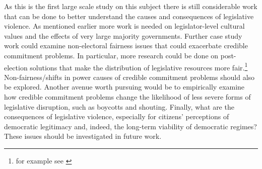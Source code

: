 \documentclass[a4paper]{article}\usepackage[]{graphicx}\usepackage[]{color}
\begin{document}
As this is the first large scale study on this subject there is still considerable work that can be done to better understand the causes and consequences of legislative violence. As mentioned earlier more work is needed on legislator-level cultural values and the effects of very large majority governments. Further case study work could examine non-electoral fairness issues that could exacerbate credible commitment problems. In particular, more research could be done on post-election solutions that make the distribution of legislative resources more fair.\footnote{for example see \citealt[who examined informal minority party access to power in Japan's Diet]{Wolfe2004}} Non-fairness/shifts in power causes of credible commitment problems should also be explored. Another avenue worth pursuing would be to empirically examine how credible commitment problems change the likelihood of less severe forms of legislative disruption, such as boycotts and shouting. Finally, what are the consequences of legislative violence, especially for citizens' perceptions of democratic legitimacy and, indeed, the long-term viability of democratic regimes? These issues should be investigated in future work. 




\end{document}
